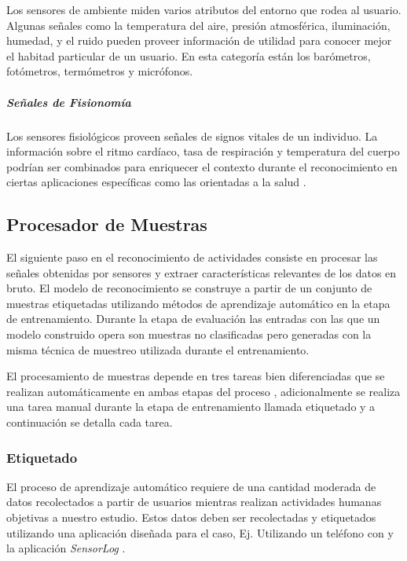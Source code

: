 Los sensores de ambiente miden varios atributos del entorno que rodea
al usuario. Algunas señales como la temperatura del aire, presión
atmosférica, iluminación, humedad, y el ruido pueden proveer información
de utilidad para conocer mejor el habitad particular de un usuario.
En esta categoría están los barómetros, fotómetros, termómetros y
micrófonos.

\subparagraph{Señales de Fisionomía}

Los sensores fisiológicos proveen señales de signos vitales de un
individuo. La información sobre el ritmo cardíaco, tasa de respiración
y temperatura del cuerpo podrían ser combinados para enriquecer el
contexto durante el reconocimiento en ciertas aplicaciones específicas
como las orientadas a la salud \cite{LaraLabrador2013}.

\subsection{Procesador de Muestras}

\label{sec44:proceso-senales}El siguiente paso en el reconocimiento
de actividades consiste en procesar las señales obtenidas por sensores
y extraer características relevantes de los datos en bruto. El modelo
de reconocimiento se construye a partir de un conjunto de muestras
etiquetadas utilizando métodos de aprendizaje automático en la etapa
de entrenamiento. Durante la etapa de evaluación las entradas con
las que un modelo construido opera son muestras no clasificadas pero
generadas con la misma técnica de muestreo utilizada durante el entrenamiento.

El procesamiento de muestras depende en tres tareas bien diferenciadas
que se realizan automáticamente en ambas etapas del proceso ,
adicionalmente se realiza una tarea manual durante la etapa de entrenamiento
llamada etiquetado y a continuación se detalla cada tarea.

\subsubsection{Etiquetado}

\label{ssec44:labeling}El proceso de aprendizaje automático requiere
de una cantidad moderada de datos recolectados a partir de usuarios
mientras realizan actividades humanas objetivas a nuestro estudio.
Estos datos deben ser recolectadas y etiquetados utilizando una aplicación
diseñada para el caso, Ej. Utilizando un teléfono con \emph{
}y la aplicación \emph{SensorLog} \cite{Alan2014s}. 

